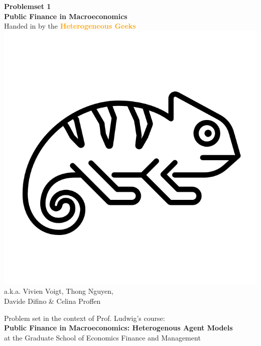 \documentclass[12pt,a4paper]{article}
\begin{document}
\begin{center}
       \vspace*{1cm}
       \huge\textbf{Problemset 1} \\
       \vspace{0.4cm}
       \large \textbf{Public Finance in Macroeconomics} \\
       \vspace{0.5cm}
        \large Handed in by the \textcolor{orange}{\textbf{Heterogeneous Geeks}} \\ 
        
        \includegraphics[scale=0.1]{geek.png} \\ 
        \vspace{0.3cm}
        a.k.a. Vivien Voigt, Thong Nguyen, \\Davide Difino \& Celina Proffen \\
       \vspace{1.5cm}
       \vfill
       
       
        Problem set in the context of Prof. Ludwig's course: \\
        \textbf{Public Finance in Macroeconomics: Heterogenous Agent Models}\\
        at the Graduate School of Economics Finance and Management
       \vspace{0.8cm}
   \end{center}
\end{document}
